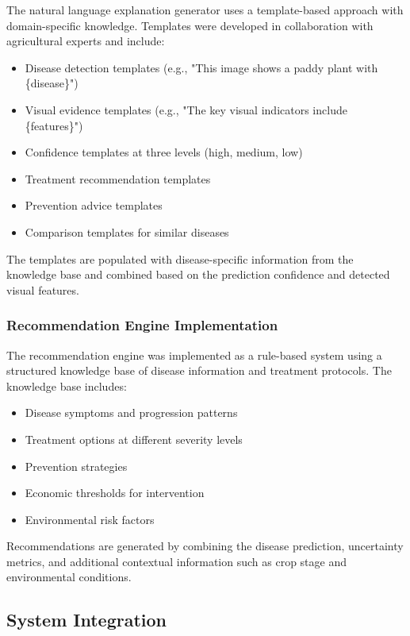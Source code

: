 The natural language explanation generator uses a template-based approach with domain-specific knowledge. Templates were developed in collaboration with agricultural experts and include:

\begin{itemize}
    \item Disease detection templates (e.g., "This image shows a paddy plant with \{disease\}")
    \item Visual evidence templates (e.g., "The key visual indicators include \{features\}")
    \item Confidence templates at three levels (high, medium, low)
    \item Treatment recommendation templates
    \item Prevention advice templates
    \item Comparison templates for similar diseases
\end{itemize}

The templates are populated with disease-specific information from the knowledge base and combined based on the prediction confidence and detected visual features.

\subsubsection{Recommendation Engine Implementation}

The recommendation engine was implemented as a rule-based system using a structured knowledge base of disease information and treatment protocols. The knowledge base includes:

\begin{itemize}
    \item Disease symptoms and progression patterns
    \item Treatment options at different severity levels
    \item Prevention strategies
    \item Economic thresholds for intervention
    \item Environmental risk factors
\end{itemize}

Recommendations are generated by combining the disease prediction, uncertainty metrics, and additional contextual information such as crop stage and environmental conditions.

\subsection{System Integration}

